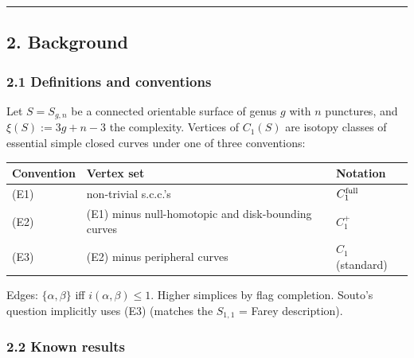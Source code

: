 \documentclass[
]{article}
\newcounter{none} %
\begin{document}
\begin{center}\rule{0.5\linewidth}{0.5pt}\end{center}

\subsection{2. Background}\label{background}

\subsubsection{2.1 Definitions and
conventions}\label{definitions-and-conventions}

Let \(S = S_{g,n}\) be a connected orientable surface of genus \(g\)
with \(n\) punctures, and \(\xi(S) := 3g + n - 3\) the complexity.
Vertices of \(C_1(S)\) are isotopy classes of essential simple closed
curves under one of three conventions:

{\def\LTcaptype{none} %
\begin{longtable}[]{@{}lll@{}}
\toprule\noalign{}
Convention & Vertex set & Notation \\
\midrule\noalign{}
\endhead
\bottomrule\noalign{}
\endlastfoot
(E1) & non-trivial s.c.c.'s & \(C_1^{\rm full}\) \\
(E2) & (E1) minus null-homotopic and disk-bounding curves & \(C_1^+\) \\
(E3) & (E2) minus peripheral curves & \(C_1\) (standard) \\
\end{longtable}
}

Edges: \(\{\alpha, \beta\}\) iff \(i(\alpha, \beta) \le 1\). Higher
simplices by flag completion. Souto's question implicitly uses (E3)
(matches the \(S_{1,1}\) = Farey description).

\subsubsection{2.2 Known results}\label{known-results}
\end{document}
